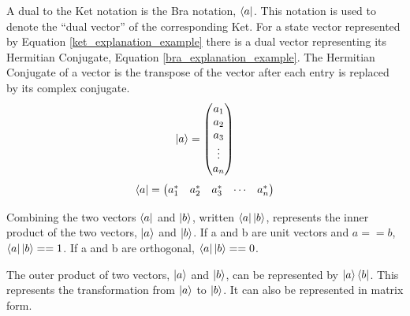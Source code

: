 A dual to the Ket notation is the Bra notation, $\left\langle{a}\right\vert$.
This notation is used to denote the ``dual vector'' of the corresponding Ket.
For a state vector represented by Equation \ref{ket_explanation_example} there is a dual vector representing its Hermitian Conjugate, Equation \ref{bra_explanation_example}.
The Hermitian Conjugate of a vector is the transpose of the vector after each entry is replaced by its complex conjugate.
\begin{equation}
\label{ket_explanation_example}
\left\vert{a}\right\rangle = 
\begin{pmatrix}
a_1\\
a_2\\
a_3\\
\vdots \\
a_n
\end{pmatrix}
\end{equation}
\begin{equation}
\label{bra_explanation_example}
\left\langle{a}\right\vert = 
\begin{pmatrix}
a_1^{*}&
a_2^{*}&
a_3^{*}&
\cdots &
a_n^{*}
\end{pmatrix}
\end{equation}

Combining the two vectors $\left\langle{a}\right\vert$ and $\left\vert{b}\right\rangle$, written $\left\langle{a}\right\vert\left\vert{b}\right\rangle$, represents the inner product of the two vectors, $\left\vert{a}\right\rangle$ and $\left\vert{b}\right\rangle$.
If a and b are unit vectors and $a == b$, $\left\langle{a}\right\vert\left\vert{b}\right\rangle == 1$.
If a and b are orthogonal, $\left\langle{a}\right\vert\left\vert{b}\right\rangle == 0$.

The outer product of two vectors, $\left\vert{a}\right\rangle$ and $\left\vert{b}\right\rangle$, can be represented by $\left\vert{a}\right\rangle\left\langle{b}\right\vert$.
This represents the transformation from $\left\vert{a}\right\rangle$ to $\left\vert{b}\right\rangle$.
It can also be represented in matrix form.

